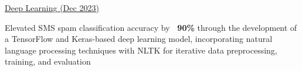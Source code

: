\documentclass[]{awesome-cv}
\begin{document}
\begin{cventries}
{\begin{cvitems}
	\end{cvitems}}
	{\href{https://k-ashik.github.io/Khalid-The-Data-Analyst.github.io/}{Deep Learning (Dec 2023)}}
	{\begin{cvitems}
		\item {Elevated SMS spam classification accuracy by \textbf{~{}90\%} through the development of a TensorFlow and Keras-based deep learning model, incorporating natural language processing techniques with NLTK for iterative data preprocessing, training, and evaluation}
		\end{cvitems}}
\end{cventries}
\end{document}
